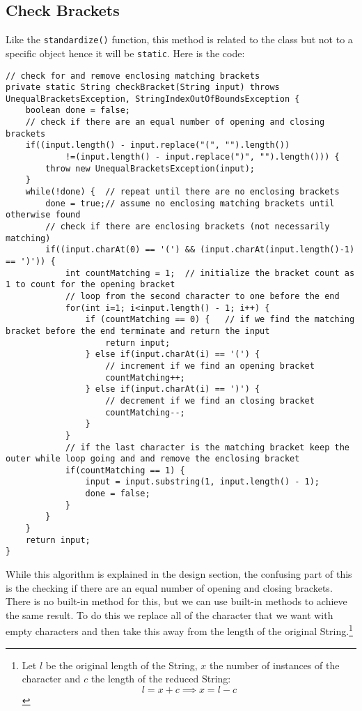 \documentclass[../../../../main.tex]{subfiles}
\begin{document}
\subsection{Check Brackets}
Like the \texttt{standardize()} function, this method is related to the class but not to a specific object hence it will be \texttt{static}. Here is the code:
\begin{verbatim}
// check for and remove enclosing matching brackets
private static String checkBracket(String input) throws UnequalBracketsException, StringIndexOutOfBoundsException {
	boolean done = false;
	// check if there are an equal number of opening and closing brackets
	if((input.length() - input.replace("(", "").length())
			!=(input.length() - input.replace(")", "").length())) {
		throw new UnequalBracketsException(input);
	}
	while(!done) {	// repeat until there are no enclosing brackets
		done = true;// assume no enclosing matching brackets until otherwise found
		// check if there are enclosing brackets (not necessarily matching)
		if((input.charAt(0) == '(') && (input.charAt(input.length()-1) == ')')) {
			int countMatching = 1;	// initialize the bracket count as 1 to count for the opening bracket 
			// loop from the second character to one before the end
			for(int i=1; i<input.length() - 1; i++) {
				if (countMatching == 0) {	// if we find the matching bracket before the end terminate and return the input
					return input;
				} else if(input.charAt(i) == '(') {
					// increment if we find an opening bracket
					countMatching++;
				} else if(input.charAt(i) == ')') {
					// decrement if we find an closing bracket
					countMatching--;
				}			
			}
			// if the last character is the matching bracket keep the outer while loop going and and remove the enclosing bracket
			if(countMatching == 1) {	
				input = input.substring(1, input.length() - 1);
				done = false;
			}
		}
	}
	return input;
}
\end{verbatim}
While this algorithm is explained in the design section, the confusing part of this is the checking if there are an equal number of opening and closing brackets. There is no built-in method for this, but we can use built-in methods to achieve the same result. To do this\cite{countInstanceStringJava} we replace all of the character that we want with empty characters and then take this away from the length of the original String.\footnote{Let $l$ be the original length of the String, $x$ the number of instances of the character and $c$ the length of the reduced String:\[l = x + c \implies x = l - c\]}
\end{document}
